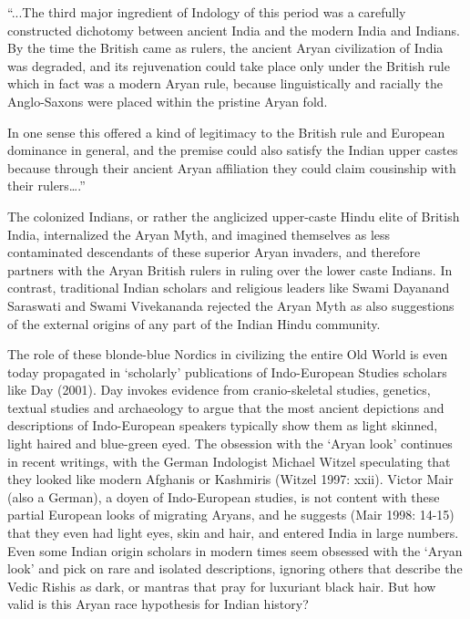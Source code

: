 \begin{myquote}
“...The third major ingredient of Indology of this period was a carefully constructed dichotomy between ancient India and the modern India and Indians. By the time the British came as rulers, the ancient Aryan civilization of India was degraded, and its rejuvenation could take place only under the British rule which in fact was a modern Aryan rule, because linguistically and racially the Anglo-Saxons were placed within the pristine Aryan fold.
\end{myquote}

\begin{myquote}
In one sense this offered a kind of legitimacy to the British rule and European dominance in general, and the premise could also satisfy the Indian upper castes because through their ancient Aryan affiliation they could claim cousinship with their rulers….”
\end{myquote}

The colonized Indians, or rather the anglicized upper-caste Hindu elite of British India, internalized the Aryan Myth, and imagined themselves as less contaminated descendants of these superior Aryan invaders, and therefore partners with the Aryan British rulers in ruling over the lower caste Indians. In contrast, traditional Indian scholars and religious leaders like Swami Dayanand Saraswati and Swami Vivekananda rejected the Aryan Myth as also suggestions of the external origins of any part of the Indian Hindu community.

The role of these blonde-blue Nordics in civilizing the entire Old World is even today propagated in ‘scholarly’ publications of Indo-European Studies scholars like Day (2001). Day invokes evidence from cranio-skeletal studies, genetics, textual studies and archaeology to argue that the most ancient depictions and descriptions of Indo-European speakers typically show them as light skinned, light haired and blue-green eyed. The obsession with the ‘Aryan look’ continues in recent writings, with the German Indologist Michael Witzel speculating that they looked like modern Afghanis or Kashmiris (Witzel 1997: xxii). Victor Mair (also a German), a doyen of Indo-European studies, is not content with these partial European looks of migrating Aryans, and he suggests (Mair 1998: 14-15) that they even had light eyes, skin and hair, and entered India in large numbers. Even some Indian origin scholars in modern times seem obsessed with the ‘Aryan look’ and pick on rare and isolated descriptions, ignoring others that describe the Vedic Rishis as dark, or mantras that pray for luxuriant black hair. But how valid is this Aryan race hypothesis for Indian history?

